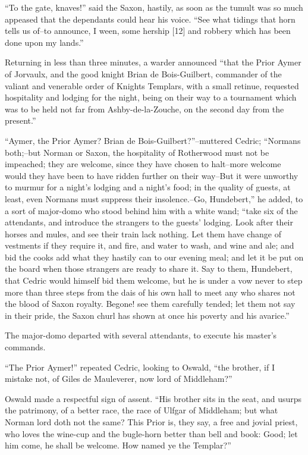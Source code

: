 ``To the gate, knaves!'' said the Saxon, hastily, as soon as the tumult
was so much appeased that the dependants could hear his voice. ``See
what tidings that horn tells us of--to announce, I ween, some hership
{[}12{]} and robbery which has been done upon my lands.''

Returning in less than three minutes, a warder announced ``that the
Prior Aymer of Jorvaulx, and the good knight Brian de Bois-Guilbert,
commander of the valiant and venerable order of Knights Templars, with a
small retinue, requested hospitality and lodging for the night, being on
their way to a tournament which was to be held not far from
Ashby-de-la-Zouche, on the second day from the present.''

``Aymer, the Prior Aymer? Brian de Bois-Guilbert?''--muttered Cedric;
``Normans both;--but Norman or Saxon, the hospitality of Rotherwood must
not be impeached; they are welcome, since they have chosen to halt--more
welcome would they have been to have ridden further on their way--But it
were unworthy to murmur for a night's lodging and a night's food; in the
quality of guests, at least, even Normans must suppress their
insolence.--Go, Hundebert,'' he added, to a sort of major-domo who stood
behind him with a white wand; ``take six of the attendants, and
introduce the strangers to the guests' lodging. Look after their horses
and mules, and see their train lack nothing. Let them have change of
vestments if they require it, and fire, and water to wash, and wine and
ale; and bid the cooks add what they hastily can to our evening meal;
and let it be put on the board when those strangers are ready to share
it. Say to them, Hundebert, that Cedric would himself bid them welcome,
but he is under a vow never to step more than three steps from the dais
of his own hall to meet any who shares not the blood of Saxon royalty.
Begone! see them carefully tended; let them not say in their pride, the
Saxon churl has shown at once his poverty and his avarice.''

The major-domo departed with several attendants, to execute his master's
commands.

``The Prior Aymer!'' repeated Cedric, looking to Oswald, ``the brother,
if I mistake not, of Giles de Mauleverer, now lord of Middleham?''

Oswald made a respectful sign of assent. ``His brother sits in the seat,
and usurps the patrimony, of a better race, the race of Ulfgar of
Middleham; but what Norman lord doth not the same? This Prior is, they
say, a free and jovial priest, who loves the wine-cup and the bugle-horn
better than bell and book: Good; let him come, he shall be welcome. How
named ye the Templar?''

